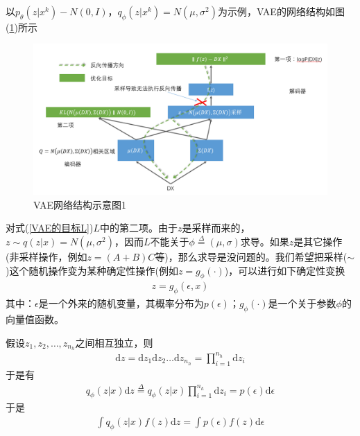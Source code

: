             \par
            以$p_\theta(z|x^k) - N(0,I)$，$q_\phi(z|x^k) = N(\mu,\sigma^2)$为示例，VAE的网络结构如图(\ref{fig:VAE网络结构示意图1})所示
            \begin{figure}[H]
            \centering
            \includegraphics[width=12cm]{images/VAE_net_structure1.jpg}
            \caption{VAE网络结构示意图1}
            \label{fig:VAE网络结构示意图1}
            \end{figure}
            \par
            对式(\ref{VAE的目标L})$L$中的第二项。由于$z$是采样而来的，$z\sim q(z|x) = N(\mu,\sigma^2)$，因而$L$不能关于$\phi \overset{\Delta}{=}(\mu,\sigma)$求导。如果$z$是其它操作(非采样操作，例如$z = (A+B)C$等)，那么求导是没问题的。我们希望把采样($\sim$)这个随机操作变为某种确定性操作(例如$z = g_\phi(\cdot)$)，可以进行如下确定性变换
            \begin{align*}
            z = g_\phi(\epsilon,x)
            \end{align*}
            其中：$\epsilon$是一个外来的随机变量，其概率分布为$p(\epsilon)$；$g_\phi(\cdot)$是一个关于参数$\phi$的向量值函数。
            \par
            假设$z_1,z_2,\dots,z_{n_h}$之间相互独立，则
            \begin{align*}
            \mathrm{d}z = \mathrm{d}z_1\mathrm{d}z_2\dots\mathrm{d}z_{n_h} = \prod_{i=1}^{n_h}\mathrm{d}z_i
            \end{align*}
            于是有
            \begin{align*}
            q_\phi(z|x)\mathrm{d}z \overset{\Delta}{=} q_\phi(z|x) \prod_{i=1}^{n_h}\mathrm{d}z_i = p(\epsilon) \mathrm{d} \epsilon
            \end{align*}
            于是
            \begin{align*}
            \int q_\phi(z|x) f(z)\mathrm{d}z = \int p(\epsilon) f(z)\mathrm{d}\epsilon
            \end{align*}
